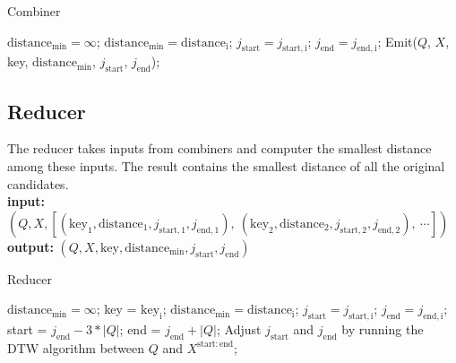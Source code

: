 \documentclass{article}
\begin{document}
\begin{algorithm}
	\caption{Combiner}
	\begin{algorithmic}[1]
		\State $\mathrm{distance_{min}} = \infty$;
				\State $\mathrm{distance_{min}} = \mathrm{distance_i}$;
				\State $j_{\mathrm{start}} = j_{\mathrm{start, i}}$;
				\State $j_{\mathrm{end}} = j_{\mathrm{end, i}}$;
			\EndIf
		\EndFor
		\State Emit($Q$, $X$, key, $\mathrm{distance_{min}}$, $j_{\mathrm{start}}$, $j_{\mathrm{end}}$);
	\end{algorithmic}
\end{algorithm}

\subsection*{Reducer}
The reducer takes inputs from combiners and computer the smallest distance among these inputs. The result contains the smallest distance of all the original candidates.\\
\textbf{input:} $(Q, X, [(\mathrm{key_1}, \mathrm{distance_1}, j_\mathrm{start, 1}, j_\mathrm{end, 1}),\ (\mathrm{key_2}, \mathrm{distance_2}, j_\mathrm{start, 2}, j_\mathrm{end, 2}),\ \cdots])$ \\
\textbf{output:} $(Q, X, \mathrm{key}, \mathrm{distance_{min}}, j_{\mathrm{start}}, j_{\mathrm{end}})$ \par

\begin{algorithm}
	\caption{Reducer}
	\begin{algorithmic}[1]
		\State $\mathrm{distance_{min}} = \infty$;
				\State key = $\mathrm{key_i}$;
				\State $\mathrm{distance_{min}} = \mathrm{distance_i}$;
				\State $j_{\mathrm{start}} = j_{\mathrm{start, i}}$;
				\State $j_{\mathrm{end}} = j_{\mathrm{end, i}}$;
			\EndIf
		\EndFor
		\State start = $j_{\mathrm{end}} - 3*|Q|$;
		\State end = $j_{\mathrm{end}} + |Q|$;
		\State Adjust $j_{\mathrm{start}}$ and $j_{\mathrm{end}}$ by running the DTW algorithm between $Q$ and $X^{\mathrm{start:end}}$;
	\end{algorithmic}
\end{algorithm}
\end{document}
